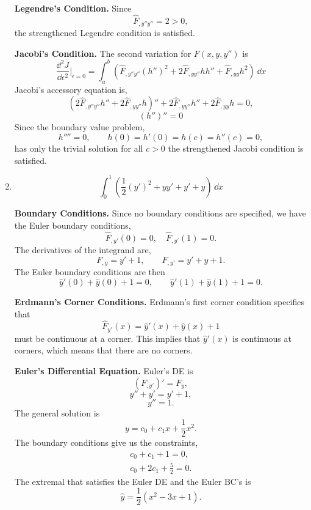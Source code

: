 \begin{Solution}
\begin{enumerate}
    \textbf{Legendre's Condition.}
    Since
    \[
    \hat{F}_{,y''y''} = 2 > 0,
    \]
    the strengthened Legendre condition is satisfied.


    \textbf{Jacobi's Condition.}
    The second variation for $F(x,y,y'')$ is
    \[
    \frac{\dd^2 J}{\dd \epsilon^2} \bigg|_{\epsilon = 0}
    =
    \int_a^b \left( \hat{F}_{,y''y''} (h'')^2 + 2 \hat{F}_{,y y''} h h''
      + \hat{F}_{,y y} h^2 \right) \,\dd x
    \]
    Jacobi's accessory equation is,
    \[
    (2 \hat{F}_{,y''y''} h'' + 2 \hat{F}_{,y y''} h)''
    + 2 \hat{F}_{,y y''} h'' + 2 \hat{F}_{,y y} h = 0,
    \]
    \[
    ( h'' )'' = 0
    \]
    Since the boundary value problem,
    \[
    h'''' = 0, \qquad 
    h(0) = h'(0) = h(c) = h''(c) = 0,
    \]
    has only the trivial solution for all $c > 0$ the strengthened Jacobi
    condition is satisfied.  



    \begin{center}
    \end{center}
  \item
    \[
    \int_0^1 \left( \frac{1}{2} (y')^2 + y y' + y' + y \right) \,\dd x
    \]

    \textbf{Boundary Conditions.}
    Since no boundary conditions are specified, we have the Euler boundary
    conditions,
    \[
    \hat{F}_{,y'}(0) = 0, \quad
    \hat{F}_{,y'}(1) = 0.
    \]
    The derivatives of the integrand are,
    \[
    F_{,y} = y' + 1, \qquad
    F_{,y'} = y' + y + 1.
    \]
    The Euler boundary conditions are then
    \[
    \hat{y}'(0) + \hat{y}(0) + 1 = 0, \qquad
    \hat{y}'(1) + \hat{y}(1) + 1 = 0.
    \]

    \textbf{Erdmann's Corner Conditions.}
    Erdmann's first corner condition specifies that 
    \[
    \hat{F}_{y'}(x) = \hat{y}'(x) + \hat{y}(x) + 1
    \]
    must be continuous at a corner.  This implies that $\hat{y}'(x)$ is 
    continuous at corners, which means that there are no corners.


    \textbf{Euler's Differential Equation.}
    Euler's DE is
    \[
    \left( F_{,y'} \right)' = F_y,
    \]
    \[
    y'' + y' = y' + 1,
    \]
    \[
    y'' = 1.
    \]
    The general solution is
    \[
    y = c_0 + c_1 x + \frac{1}{2} x^2.
    \]
    The boundary conditions give us the constraints,
    \begin{align*}
      c_0 + c_1 + 1 = 0, \\
      c_0 + 2 c_1 + \frac{5}{2} = 0.
    \end{align*}
    The extremal that satisfies the Euler DE and the Euler BC's is
    \[
    \hat{y} = \frac{1}{2} \left( x^2 - 3 x + 1 \right).
    \]




\end{enumerate}
\end{Solution}
